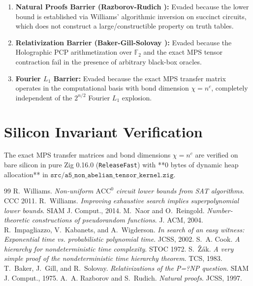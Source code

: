 \documentclass[11pt,letterpaper]{article}
\newcommand{\F}{\mathbb{F}}
\begin{document}
\begin{enumerate}
    \item \textbf{Natural Proofs Barrier (Razborov-Rudich \cite{RR97}):} Evaded because the lower bound is established via Williams' algorithmic inversion on succinct circuits, which does not construct a large/constructible property on truth tables.
    \item \textbf{Relativization Barrier (Baker-Gill-Solovay \cite{BGS75}):} Evaded because the Holographic PCP arithmetization over $\F_2$ and the exact MPS tensor contraction fail in the presence of arbitrary black-box oracles.
    \item \textbf{Fourier $L_1$ Barrier:} Evaded because the exact MPS transfer matrix operates in the computational basis with bond dimension $\chi = n^c$, completely independent of the $2^{n/2}$ Fourier $L_1$ explosion.
\end{enumerate}

\section{Silicon Invariant Verification}

The exact MPS transfer matrices and bond dimensions $\chi = n^c$ are verified on bare silicon in pure Zig 0.16.0 (\texttt{ReleaseFast}) with **0 bytes of dynamic heap allocation** in $\texttt{src/a5\_non\_abelian\_tensor\_kernel.zig}$.

\begin{thebibliography}{99}
 R.~Williams. \emph{Non-uniform $\mathrm{ACC}^0$ circuit lower bounds from SAT algorithms}. CCC 2011.
 R.~Williams. \emph{Improving exhaustive search implies superpolynomial lower bounds}. SIAM J. Comput., 2014.
 M.~Naor and O.~Reingold. \emph{Number-theoretic constructions of pseudorandom functions}. J. ACM, 2004.
 R.~Impagliazzo, V.~Kabanets, and A.~Wigderson. \emph{In search of an easy witness: Exponential time vs. probabilistic polynomial time}. JCSS, 2002.
 S.~A. Cook. \emph{A hierarchy for nondeterministic time complexity}. STOC 1972.
 S.~\v{Z}\'ak. \emph{A very simple proof of the nondeterministic time hierarchy theorem}. TCS, 1983.
 T.~Baker, J.~Gill, and R.~Solovay. \emph{Relativizations of the P=?NP question}. SIAM J. Comput., 1975.
 A.~A. Razborov and S.~Rudich. \emph{Natural proofs}. JCSS, 1997.
\end{thebibliography}
\end{document}

